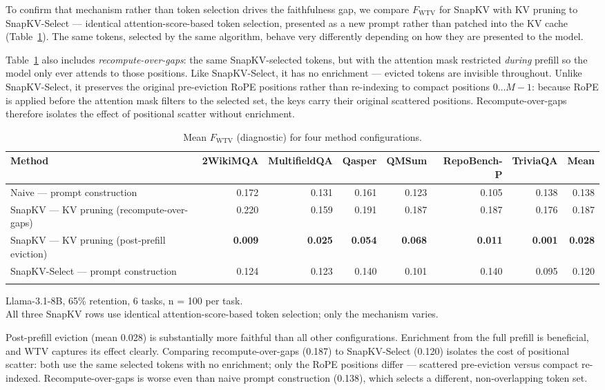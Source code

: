 \documentclass[10pt,letterpaper]{article}
\begin{document}
To confirm that mechanism rather than token selection drives the
faithfulness gap, we compare \(F_{\text{WTV}}\) for SnapKV with KV pruning
to SnapKV-Select ---
identical attention-score-based token selection, presented as a new
prompt rather than patched into the KV cache (Table~\ref{tab:t1}). The same tokens,
selected by the same algorithm, behave very differently depending on how
they are presented to the model. 

Table~\ref{tab:t1} also includes \emph{recompute-over-gaps}: the same
SnapKV-selected tokens, but with the attention mask restricted
\emph{during} prefill so the model only ever attends to those positions.
Like SnapKV-Select, it has no enrichment --- evicted tokens are
invisible throughout. Unlike SnapKV-Select, it preserves the original
pre-eviction RoPE positions rather than re-indexing to compact positions
$0\ldots M-1$: because RoPE is applied before the attention mask
filters to the selected set, the keys carry their original scattered
positions. Recompute-over-gaps therefore isolates the effect of
positional scatter without enrichment.
\begin{table}[H]
\centering
\small
\caption{Mean \(F_{\text{WTV}}\) (diagnostic) for four method configurations.}
\label{tab:t1}
\begin{tabular}{@{}>{\raggedright\arraybackslash}p{}rrrrrrr@{}}
\toprule
Method & 2WikiMQA & MultifieldQA & Qasper & QMSum & RepoBench-P & TriviaQA & Mean\\
\midrule
Naive --- prompt construction & 0.172 & 0.131 & 0.161 & 0.123 & 0.105 & 0.138 & 0.138\\
SnapKV --- KV pruning (recompute-over-gaps) & 0.220 & 0.159 & 0.191 & 0.187 & 0.187 & 0.176 & 0.187\\
SnapKV --- KV pruning (post-prefill eviction) & \textbf{0.009} & \textbf{0.025} & \textbf{0.054} & \textbf{0.068} & \textbf{0.011} & \textbf{0.001} & \textbf{0.028}\\
SnapKV-Select --- prompt construction & 0.124 & 0.123 & 0.140 & 0.101 & 0.140 & 0.095 & 0.120\\
\bottomrule
\\
\end{tabular}
Llama-3.1-8B, 65\% retention, 6 tasks, n = 100 per task.\\All three
SnapKV rows use identical attention-score-based token selection; only
the mechanism varies.
\end{table}

Post-prefill eviction (mean 0.028) is substantially more faithful than all
other configurations. Enrichment from the full prefill is beneficial, and
WTV captures its effect clearly. Comparing recompute-over-gaps (0.187) to
SnapKV-Select (0.120) isolates the cost of positional scatter: both use the
same selected tokens with no enrichment; only the RoPE positions differ ---
scattered pre-eviction versus compact re-indexed. Recompute-over-gaps is
worse even than naive prompt construction (0.138), which selects a
different, non-overlapping token set.
\end{document}
